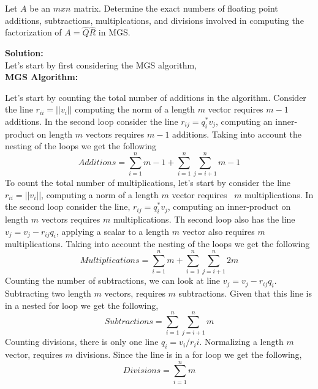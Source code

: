 \documentclass[12pt]{article}
\makeatletter
\theoremstyle{homework}
\newenvironment{exercise}[1]
{\def\@currentlabel{#1}\exercisecore}
{\endexercisecore}
\newcommand{\localhead}[1]{\par\smallskip\noindent\textbf{#1}\nobreak\\}%
\newcommand\solution{\localhead{Solution:}}
\makeatother
\begin{document}
\vspace{1in}

\begin{exercise}{8.1} Let $A$ be an $mxn$ matrix. Determine the exact numbers of floating point additions, subtractions, multiplcations, and divisions
  involved in computing the factorization of $A = \hat{Q}\hat{R}$ in MGS.\\
  \solution Let's start by first considering the MGS algorithm, \\
  \textbf{MGS Algorithm:}
  \begin{center}
    
    \end{center}
  Let's start by counting the total number of additions in the algorithm. Consider the line $r_{ii} = ||v_i||$ computing the norm of a length $m$
  vector requires $m-1$ additions. In the second loop consider the line $r_{ij} = q^*_iv_j$, computing an inner-product on length $m$ vectors requires 
  $m-1$ additions. Taking into account the nesting of the loops we get the following 
  \begin{equation*}
    Additions = \sum_{i = 1}^n m-1 + \sum_{i = 1}^n\sum_{j = i + 1}^n m-1
  \end{equation*}
  To count the total number of multiplications, let's start by consider the line $r_{ii} = ||v_i||$, computing a norm of a length $m$ vector requires \
  $m$ multiplications. In the second loop consider the line, $r_{ij} = q^*_iv_j$, computing an inner-product on length $m$ vectors requires 
  $m$ multiplications. Th second loop also has the line $v_j = v_j -r_{ij}q_i$, applying a scalar to a length $m$ vector also requires $m$ multiplications. 
  Taking into account the nesting of the loops we get the following 
  \begin{equation*}
    Multiplications = \sum_{i = 1}^n m + \sum_{i = 1}^n\sum_{j = i + 1}^n 2m
  \end{equation*}
  Counting the number of subtractions, we can look at line $v_j = v_j -r_{ij}q_i$. Subtracting two length $m$ vectors, requires $m$ subtractions. Given that 
  this line is in a nested for loop we get the following, 
  \begin{equation*}
    Subtractions = \sum_{i = 1}^n\sum_{j = i + 1}^n m
  \end{equation*} 
  Counting divisions, there is only one line $q_i = v_i/r_ii$. Normalizing a length $m$ vector, requires $m$ divisions. Since the line is in a for loop we get the following, 
  \begin{equation*}
    Divisions = \sum_{i = 1}^n m
  \end{equation*}
  \end{exercise}
  \vspace{1in}
\end{document}
